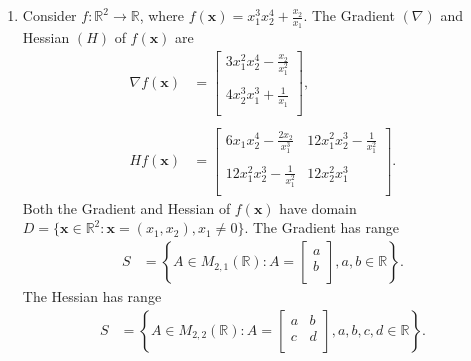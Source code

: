 \documentclass[a4paper,11pt]{article}
\newcommand{\ds}{\displaystyle}
\begin{document}
{{\begin{enumerate}[leftmargin=*]
		\item Consider $\ds{f:\mathbb{R}^2 \rightarrow \mathbb{R}}$, where $\ds{f(\mathbf{x}) = x_1^3x_2^4+ \frac{x_2}{x_1}}$. The Gradient $\ds{(\nabla)}$ and Hessian $\ds{(H)}$ of $\ds{f(\mathbf{x})}$ are
			\begin{align*}
				\nabla f(\mathbf{x}) & = 
				\begin{bmatrix}
					3x_1^2x_2^4 - \frac{x_2}{x_1^2} \\
					\\
					4x_2^3x_1^3 + \frac{1}{x_1} \\
				\end{bmatrix}, \\
				\\
				Hf(\mathbf{x}) & = 
				\begin{bmatrix}
					6x_1x_2^4 - \frac{2x_2}{x_1^3} & 12x_1^2x_2^3 - \frac{1}{x_1^2} \\
					\\
					12x_1^2x_2^3 - \frac{1}{x_1^2} & 12x_2^2x_1^3 \\
				\end{bmatrix}.
			\end{align*}
			Both the Gradient and Hessian of $\ds{f(\mathbf{x})}$ have domain $\ds{D = \{\mathbf{x} \in \mathbb{R}^2 : \mathbf{x} = (x_1,x_2), x_1 \neq 0\}}$. The Gradient has range 
				\begin{align*} S & = \left\{A \in M_{2,1}(\mathbb{R}) : A =
						\begin{bmatrix}
							a \\
							b \\
						\end{bmatrix},
					a,b \in \mathbb{R} \right\}.
				\end{align*}
				The Hessian has range
				\begin{align*} S & = \left\{A \in M_{2,2}(\mathbb{R}) : A =
						\begin{bmatrix}
							a & b \\
							c & d \\
						\end{bmatrix},
					a,b,c,d \in \mathbb{R} \right\}.
				\end{align*}


\end{enumerate}}}
\end{document}
